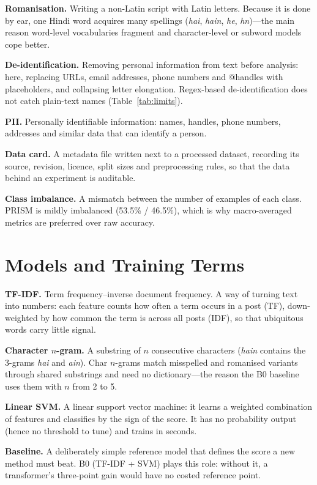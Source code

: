 \textbf{Romanisation.} Writing a non-Latin script with Latin letters. Because it
is done by ear, one Hindi word acquires many spellings (\emph{hai}, \emph{hain},
\emph{he}, \emph{hn})---the main reason word-level vocabularies fragment and
character-level or subword models cope better.

\textbf{De-identification.} Removing personal information from text before
analysis: here, replacing URLs, email addresses, phone numbers and @handles with
placeholders, and collapsing letter elongation. Regex-based de-identification does
not catch plain-text names (Table~\ref{tab:limits}).

\textbf{PII.} Personally identifiable information: names, handles, phone numbers,
addresses and similar data that can identify a person.

\textbf{Data card.} A metadata file written next to a processed dataset,
recording its source, revision, licence, split sizes and preprocessing rules, so
that the data behind an experiment is auditable.

\textbf{Class imbalance.} A mismatch between the number of examples of each
class. PRISM is mildly imbalanced (53.5\% / 46.5\%), which is why macro-averaged
metrics are preferred over raw accuracy.

\section{Models and Training Terms}
\label{app:models}

\textbf{TF-IDF.} Term frequency--inverse document frequency. A way of turning text
into numbers: each feature counts how often a term occurs in a post (TF), down-weighted
by how common the term is across all posts (IDF), so that ubiquitous words carry
little signal.

\textbf{Character $n$-gram.} A substring of $n$ consecutive characters
(\emph{hain} contains the 3-grams \emph{hai} and \emph{ain}). Char $n$-grams
match misspelled and romanised variants through shared substrings and need no
dictionary---the reason the B0 baseline uses them with $n$ from 2 to 5.

\textbf{Linear SVM.} A linear support vector machine: it learns a weighted
combination of features and classifies by the sign of the score. It has no
probability output (hence no threshold to tune) and trains in seconds.

\textbf{Baseline.} A deliberately simple reference model that defines the score a
new method must beat. B0 (TF-IDF + SVM) plays this role: without it, a
transformer's three-point gain would have no costed reference point.

